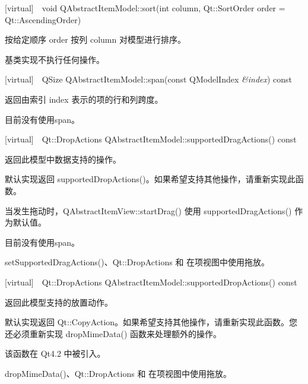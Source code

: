 [virtual] void QAbstractItemModel::sort(int column, Qt::SortOrder order = Qt::AscendingOrder)

按给定顺序 order 按列 column 对模型进行排序。

基类实现不执行任何操作。

[virtual] QSize QAbstractItemModel::span(const QModelIndex \emph{\&index}) const

返回由索引 index 表示的项的行和列跨度。

\begin{notice}
目前没有使用span。
\end{notice}

[virtual] Qt::DropActions QAbstractItemModel::supportedDragActions() const

返回此模型中数据支持的操作。

默认实现返回 supportedDropActions()。如果希望支持其他操作，请重新实现此函数。

当发生拖动时，QAbstractItemView::startDrag() 使用 supportedDragActions() 作为默认值。

\begin{notice}
目前没有使用span。
\end{notice}

\begin{seeAlso}
setSupportedDragActions()、Qt::DropActions 和 在项视图中使用拖放。
\end{seeAlso}

[virtual] Qt::DropActions QAbstractItemModel::supportedDropActions() const

返回此模型支持的放置动作。

默认实现返回 Qt::CopyAction。如果希望支持其他操作，请重新实现此函数。您还必须重新实现 dropMimeData() 函数来处理额外的操作。

该函数在 Qt4.2 中被引入。

\begin{seeAlso}
dropMimeData()、Qt::DropActions 和 在项视图中使用拖放。
\end{seeAlso}